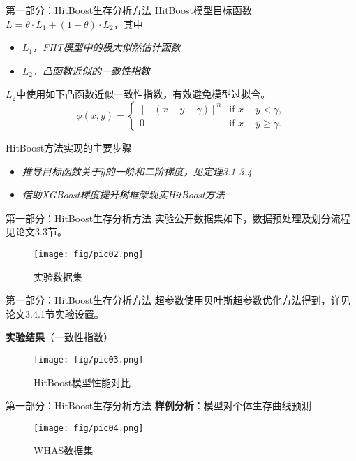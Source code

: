 \documentclass[10pt]{beamer}
\begin{document}
\begin{frame}{第一部分：HitBoost生存分析方法}
  HitBoost模型目标函数$L=\theta \cdot L_1 + (1-\theta) \cdot L_2$，其中
  \begin{itemize}
    \item \textit{$L_1$，FHT模型中的极大似然估计函数}
    \item \textit{$L_2$，凸函数近似的一致性指数}
  \end{itemize}

  $L_2$中使用如下凸函数近似一致性指数，有效避免模型过拟合。
  $$\phi(x,y)=
    \begin{cases}
      {[-(x-y-\gamma)]}^n & \text{if } x-y < \gamma,\\
      0 & \text{if } x-y \ge \gamma.
    \end{cases}$$

  HitBoost方法实现的主要步骤
  \begin{itemize}
    \item \textit{推导目标函数关于$\hat{y}$的一阶和二阶梯度，见定理3.1-3.4}
    \item \textit{借助XGBoost梯度提升树框架现实HitBoost方法}
  \end{itemize}
\end{frame}

\begin{frame}{第一部分：HitBoost生存分析方法}
  实验公开数据集如下，数据预处理及划分流程见论文3.3节。
  \begin{figure}[H]
    \centering
    \texttt{[image: fig/pic02.png]}
    \caption{实验数据集}
  \end{figure}

\end{frame}

\begin{frame}{第一部分：HitBoost生存分析方法}
  超参数使用贝叶斯超参数优化方法得到，详见论文3.4.1节实验设置。


  \textbf{实验结果}（一致性指数）
  \begin{figure}[H]
    \centering
    \texttt{[image: fig/pic03.png]}
    \caption{HitBoost模型性能对比}
  \end{figure}

\end{frame}

\begin{frame}{第一部分：HitBoost生存分析方法}
  \textbf{样例分析}：模型对个体生存曲线预测
  \begin{figure}[H]
    \centering
    \texttt{[image: fig/pic04.png]}
    \caption{WHAS数据集}
  \end{figure}

\end{frame}
\end{document}
